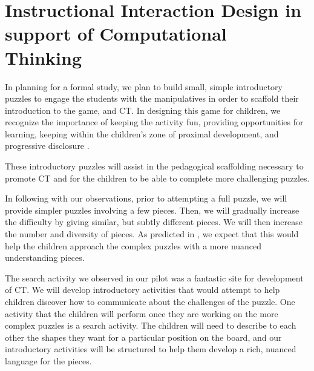 \documentclass{acm_proc_article-sp}
\begin{document}
\section{Instructional Interaction Design in support of Computational Thinking}
\label{sec:instructional_design}
In planning for a formal study, we plan to build small, simple introductory puzzles to engage the students with the manipulatives in order to scaffold their introduction to the game, and CT.
In designing this game for children, we recognize the importance of keeping the activity fun, providing opportunities for learning, keeping within the children's zone of proximal development\cite{vygotsky1987zone}, and progressive disclosure \cite{nielsen2006progressive}.

These introductory puzzles will assist in the pedagogical scaffolding necessary to promote CT and for the children to be able to complete more challenging puzzles.

In following with our observations, prior to attempting a full puzzle, we will provide simpler puzzles involving a few pieces. 
Then, we will gradually increase the difficulty by giving similar, but subtly different pieces.
We will then increase the number and diversity of pieces. 
As predicted in {\em \hyperref[sec:observations]{}}
, we expect that this would help the children approach the complex puzzles with a more nuanced understanding pieces.

The search activity we observed in our pilot was a fantastic site for development of CT. 
We will develop introductory activities that would attempt to help children discover how to communicate about the challenges of the puzzle. 
One activity that the children will perform once they are working on the more complex puzzles is a search activity. 
The children will need to describe to each other the shapes they want for a particular position on the board, and our introductory activities will be structured to help them develop a rich, nuanced language for the pieces.
\end{document}
